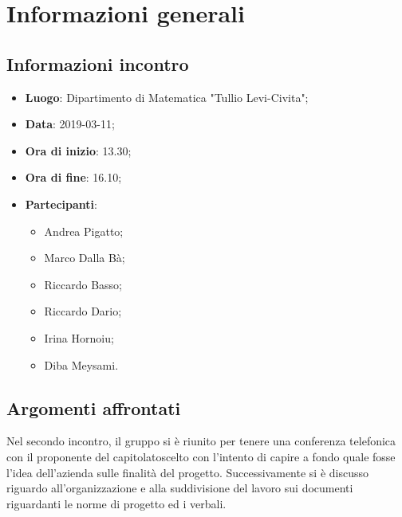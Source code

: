 \section{Informazioni generali}

\subsection{Informazioni incontro}
\begin{itemize}
	\item \textbf{Luogo}: Dipartimento di Matematica "Tullio Levi-Civita";
	\item \textbf{Data}: 2019-03-11;
	\item \textbf{Ora di inizio}: 13.30;
	\item \textbf{Ora di fine}: 16.10;
	\item \textbf{Partecipanti}: 
	\begin{itemize}
		\item Andrea Pigatto;
		\item Marco Dalla Bà;
		\item Riccardo Basso;
		\item Riccardo Dario;
		\item Irina Hornoiu;
		\item Diba Meysami.
	\end{itemize}
\end{itemize}

\subsection{Argomenti affrontati}
Nel secondo incontro, il gruppo si è riunito per tenere una conferenza telefonica con il proponente del capitolato\glosp scelto
con l'intento di capire a fondo quale fosse l'idea dell'azienda sulle finalità del progetto. 
Successivamente si è discusso riguardo all'organizzazione e alla suddivisione del lavoro sui documenti riguardanti le norme di progetto ed i verbali.
